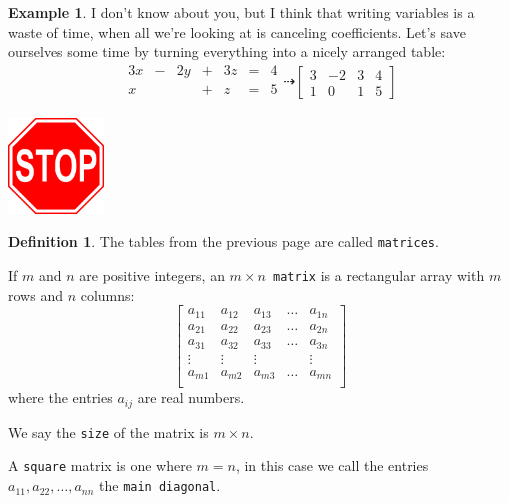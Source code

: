 \documentclass[handout]{beamer}
\theoremstyle{definition}
\newtheorem*{defn}{Definition}
\newtheorem*{exa}{Example}
\renewcommand{\emph}[1]{{\color{blue}\texttt{#1}}}
\begin{document}
\begin{frame}{\insertframenumber}
	\begin{exa}
	I don't know about you, but I think that writing variables is a waste of time, when all we're looking at is canceling coefficients.  Let's save ourselves some time by turning everything into a nicely arranged table:
	\[\begin{array}{rcrcrcl}
	3x&-&2y&+&3z&=&4\\
	x&&&+&z&=&5\\
	\end{array}\dashrightarrow
	\begin{bmatrix}
	3&-2&3&4\\
	1&0&1&5
	\end{bmatrix}\]
	\end{exa}
\begin{center}
\includegraphics[width=1in]{images/stop}
\end{center}
\end{frame}

\begin{frame}{\insertframenumber}
	\begin{defn}
		The tables from the previous page are called \emph{matrices}.
		
		If $m$ and $n$ are positive integers, an \emph{$m\times n$ matrix} is a rectangular array with $m$ rows and $n$ columns:
			\[\begin{bmatrix}
				a_{11}&a_{12}&a_{13}&\dots&a_{1n}\\
				a_{21}&a_{22}&a_{23}&\dots&a_{2n}\\
				a_{31}&a_{32}&a_{33}&\dots&a_{3n}\\
				\vdots&\vdots&\vdots&&\vdots\\
				a_{m1}&a_{m2}&a_{m3}&\dots&a_{mn}\\
			\end{bmatrix}\]
		where the entries $a_{ij}$ are real numbers.  
		
		We say the \emph{size} of the matrix is $m\times n$.
		
		A \emph{square} matrix is one where $m=n$, in this case we call the entries $a_{11},a_{22},\dots,a_{nn}$ the \emph{main diagonal}.
	\end{defn}
\end{frame}
\end{document}
